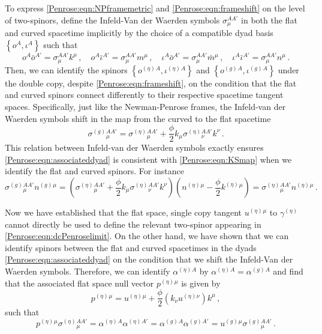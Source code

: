To express \eqref{Penrose:eqn:NPframemetric} and \eqref{Penrose:eqn:frameshift} on the level of two-spinors,   define the Infeld-Van der Waerden symbols $\sigma{}{}^{AA'}_{\mu}$ in both the flat and curved spacetime implicitly by the choice of a compatible dyad basis $\left\lbrace o^A,\iota^A \right \rbrace$ such that
\begin{equation}\label{Penrose:eqn:associateddyad}
o^A\bar{o}^{A'} = \sigma{}^{AA'}_{\mu}k^{\mu} \, , \quad o^A\bar{\iota}^{A'} = \sigma{}^{AA'}_{\mu}m^{\mu} \, , \quad \iota^A\bar{o}^{A'} = \sigma{}^{AA'}_{\mu}\bar{m}^{\mu} \, , \quad \iota^A\bar{\iota}^{A'} = \sigma{}^{AA'}_{\mu}n^{\mu} \, .
\end{equation}
Then, we can identify the spinors $\left\lbrace o^{(\eta)}{}^A,\iota^{(\eta)}{}^A \right \rbrace$ and $\left\lbrace
o^{(g)}{}^A,\iota^{(g)}{}^A \right \rbrace$ under the double copy, despite \eqref{Penrose:eqn:frameshift}, on the condition
that the flat and curved spinors connect differently to their respective spacetime tangent spaces. Specifically,
just like the Newman-Penrose frames, the Infeld-van der Waerden symbols shift in the map from the curved to the
flat spacetime  \cite{Lobo:2017bfh} 
\begin{equation}\label{Penrose:eqn:IvW}
\sigma^{(g)}{}{}^{AA'}_{\mu}   = \sigma^{(\eta)}{}{}^{AA'}_{\mu} + \frac{\phi}{2} k_{\mu} \sigma^{(\eta)}{}{}^{AA'}_{\nu} k^{\nu} \, .
\end{equation}
This relation between Infeld-van der Waerden symbols exactly ensures \eqref{Penrose:eqn:associateddyad} is consistent with \eqref{Penrose:eqn:KSmap} when we identify the flat and curved spinors. For instance
\begin{equation}
\sigma^{(g)}{}{}^{AA'}_{\mu} n^{(g)}{}^{\mu} = \left(\sigma^{(\eta)}{}{}^{AA'}_{\mu} + \frac{\phi}{2} k_{\mu} \sigma^{(\eta)}{}{}^{AA'}_{\nu} k^{\nu}\right)\left(n^{(\eta)}{}^{\mu} - \frac{\phi}{2} k^{(\eta)}{}^{\mu}\right) = \sigma^{(\eta)}{}{}^{AA'}_{\mu} n^{(\eta)}{}^{\mu}  \, .
\end{equation}

Now we have established that the flat space, single copy tangent $u^{(\eta)}{}^{\mu}$ to $\gamma^{(\eta)}$ cannot directly be used to define the relevant two-spinor appearing in \eqref{Penrose:eqn:dcPenroselimit}. On the other hand, we have shown that we can identify spinors between the flat and curved spacetimes in the dyads \eqref{Penrose:eqn:associateddyad} on the condition that we shift the Infeld-Van der Waerden symbols. Therefore, we can identify $\alpha^{(\eta)}{}^A$ by $\alpha^{(\eta)}{}^A=\alpha^{(g)}{}^A$ and find that the associated flat space null vector $p^{(\eta)}{}^{\mu}$ is given by
\begin{equation}\label{Penrose:eqn:pflat}
p^{(\eta)}{}^{\mu}  =  u^{(\eta)}{}^{\mu}+ \frac{\phi}{2} \left(k_{\nu} u^{(\eta)}{}^{\nu}\right) k^{\mu} \, ,
\end{equation}
such that
\begin{equation}
p^{(\eta)}{}^{\mu} \sigma^{(\eta)}{}^{AA'}_{\mu}  = \alpha^{(\eta)}{}^A \alpha^{(\eta)}{}^{A'} = \alpha^{(g)}{}^A \alpha^{(g)}{}^{A'} = u^{(g)}{}^{\mu} \sigma^{(g)}{}^{AA'}_{\mu} \, .
\end{equation}

